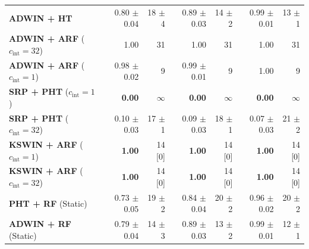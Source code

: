 \begin{table}[t]
\begin{tabular}{@{}lrrrrrr@{}}
    \midrule
    \textbf{ADWIN + HT}                            & 0.80 {\small $\pm$0.04} & 18 {\small $\pm$4} & 0.89 {\small $\pm$0.03} & 14 {\small $\pm$2} & 0.99 {\small $\pm$0.01} & 13 {\small $\pm$1} \\
    \textbf{ADWIN + ARF} ($c_{\mathrm{int}} = 32$) & 1.00 & 31 & 1.00 & 31 & 1.00 & 31 \\
    \textbf{ADWIN + ARF} ($c_{\mathrm{int}} = 1$)  & 0.98 {\small $\pm$0.02} & 9 & 0.99 {\small $\pm$0.01} & 9 & 1.00 & 9 \\
    \midrule
    \textbf{SRP + PHT} ($c_{\mathrm{int}} = 1$)    & \textbf{0.00} & $\infty$ & \textbf{0.00} & $\infty$ & \textbf{0.00} & $\infty$ \\
    \textbf{SRP + PHT} ($c_{\mathrm{int}} = 32$)   & 0.10 {\small $\pm$0.03} & 17 {\small $\pm$1} & 0.09 {\small $\pm$0.03} & 18 {\small $\pm$1} & 0.07 {\small $\pm$0.03} & 21 {\small $\pm$2} \\
    \textbf{KSWIN + ARF} ($c_{\mathrm{int}} = 1$)  & \textbf{1.00} & 14 [0] & \textbf{1.00} & 14 [0] & \textbf{1.00} & 14 [0] \\
    \textbf{KSWIN + ARF} ($c_{\mathrm{int}} = 32$) & \textbf{1.00} & 14 [0] & \textbf{1.00} & 14 [0] & \textbf{1.00} & 14 [0] \\
    \midrule
    \textbf{PHT + RF} (Static)                     & 0.73 {\small $\pm$0.05} & 19 {\small $\pm$2} & 0.84 {\small $\pm$0.04} & 20 {\small $\pm$2} & 0.96 {\small $\pm$0.02} & 20 {\small $\pm$2} \\
    \textbf{ADWIN + RF} (Static)                   & 0.79 {\small $\pm$0.04} & 14 {\small $\pm$3} & 0.89 {\small $\pm$0.03} & 13 {\small $\pm$2} & 0.99 {\small $\pm$0.01} & 12 {\small $\pm$1} \\
    \bottomrule
  \end{tabular}
\end{table}
